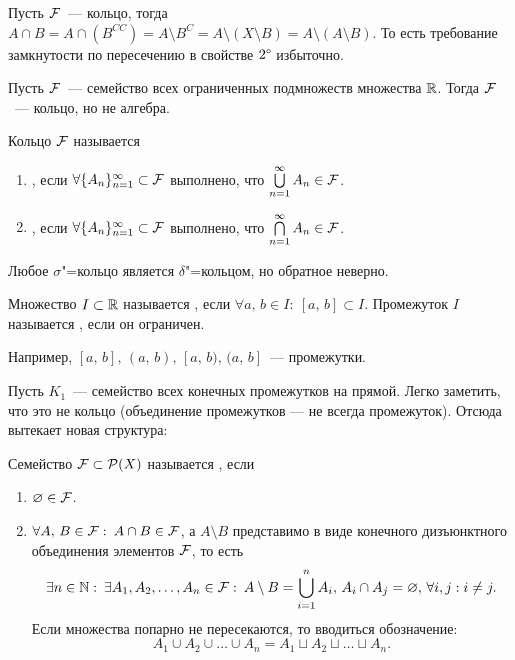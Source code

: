 \begin{remark}
	Пусть $\mathcal{F} $~--- кольцо,
	тогда $A\cap B=A\cap\left(B^{CC}\right)=A\setminus B^C=A\setminus\left(X\setminus B\right)=
		A\setminus\left(A\setminus B\right)$. То есть требование замкнутости по пересечению в свойстве $2\degree$ избыточно.
\end{remark}

\begin{exercise}
	Пусть $\mathcal{F} $~--- семейство всех ограниченных подмножеств множества $\mathbb{R}$. Тогда $\mathcal{F} $~--- кольцо, но не алгебра.
\end{exercise}

\begin{definition}
	Кольцо $\mathcal{F} $ называется
	\begin{enumerate}[label=\alph*)]
		\item {}, если $\forall \{A_n\}_{n=1}^{\infty}\subset\mathcal{F} $ выполнено, что
		      $\bigcup\limits_{n=1}^{\infty}A_n\in\mathcal{F} $.
		\item {}, если $\forall \{A_n\}_{n=1}^{\infty}\subset\mathcal{F} $ выполнено, что
		      $\bigcap\limits_{n=1}^{\infty}A_n\in\mathcal{F} $.
	\end{enumerate}
\end{definition}

\begin{remark}
	Любое $\sigma$"=кольцо является $\delta$"=кольцом, но обратное неверно.
\end{remark}

\begin{definition}
	Множество $I\subset \mathbb{R}$ называется , если $\forall a,\, b\in I:\: [a,\, b]\subset I$.
	Промежуток $I$ называется , если он ограничен.

	Например, $[a,\, b],\, (a,\, b),\, [a,\, b),\, (a,\, b]$~--- промежутки.
\end{definition}

Пусть $K_1$~--- семейство всех конечных промежутков на прямой. Легко заметить, что это не кольцо (объединение промежутков
--- не всегда промежуток). Отсюда вытекает новая структура:

\begin{definition}
	Семейство $\mathcal{F} \subset \mathcal{P} (X)$ называется , если
	\begin{enumerate}[label=\arabic*\degree.]
		\item $\varnothing\in \mathcal{F} $.
		\item $\forall A,\, B\in\mathcal{F} :\: A\cap B\in\mathcal{F} $, а $A\setminus B$ представимо в виде
		      конечного дизъюнктного объединения элементов $\mathcal{F} $, то есть
		      \[\exists n\in\mathbb{N}: \: \exists A_1,A_2,\ldots,A_n\in\mathcal{F} : \: A\setminus B=\bigcup_{i=1}^{n}A_i
			      ,\, A_i\cap A_j=\varnothing,\, \forall i,j: i\neq j.\]
		      Если множества попарно не пересекаются, то вводиться обозначение:
		      \[A_1\cup A_2\cup\ldots\cup A_n=A_1\sqcup A_2\sqcup\ldots\sqcup A_n.\]
	\end{enumerate}
\end{definition}

